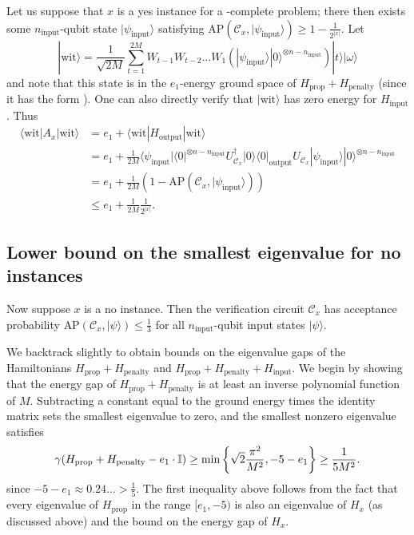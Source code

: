 \documentclass[../thesis-main/thesis-main]{subfiles}
\begin{document}
Let us suppose that  $x$ is a yes instance for a \QMA-complete problem; there then exists some $n_{\text{input}}$-qubit state $|\psi_{\text{input}}\rangle$ satisfying $\text{AP}\left(\mathcal{C}_{x},|\psi_{\text{input}}\rangle\right)\geq1-\frac{1}{2^{|x|}}$. Let
\begin{equation}
|\text{wit}\rangle=\frac{1}{\sqrt{2M}}\sum_{t=1}^{2M}W_{t-1}W_{t-2}\ldots W_{1}\left(|\psi_{\text{input}}\rangle|0\rangle^{\otimes n-n_{\text{input}}}\right)|t\rangle|\omega\rangle
\end{equation}
and note that this state is in the $e_{1}$-energy ground space of
$H_{\text{prop}}+H_{\text{penalty}}$ (since it has the form ).
One can also directly verify that $|\text{wit}\rangle$ has zero energy for $H_{\text{input}}$. Thus
\begin{align*}
\langle\text{wit}|A_{x}|\text{wit}\rangle & =e_{1}+\langle\text{wit}|H_{\text{output}}|\text{wit}\rangle\\
 & =e_{1}+\frac{1}{2M}\langle\psi_{\text{input}}|\langle0|^{\otimes n-n_{\text{input}}}U_{\mathcal{C}_{x}}^{\dagger}|0\rangle\langle0|_{\text{output}}U_{\mathcal{C}_{x}}|\psi_{\text{input}}\rangle|0\rangle^{\otimes n-n_{\text{input}}}\\
 & =e_{1}+\frac{1}{2M}\left(1-\text{AP}(\mathcal{C}_{x},|\psi_{\text{input}}\rangle)\right)\\
 & \leq e_{1}+\frac{1}{2M}\frac{1}{2^{|x|}}.
\end{align*}


\subsection{Lower bound on the smallest eigenvalue for no instances}
\label{sec:mappingno}

Now suppose $x$ is a no instance. Then the verification circuit $\mathcal{C}_{x}$ has acceptance probability $\text{AP}\left(\mathcal{C}_{x},|\psi\rangle\right)\leq\frac{1}{3}$ for all $n_{\text{input}}$-qubit input states $|\psi\rangle$.

We backtrack slightly to obtain bounds on the eigenvalue gaps of the Hamiltonians $H_{\text{prop}}+H_{\text{penalty}}$ and $H_{\text{prop}}+H_{\text{penalty}}+H_{\text{input}}$. We begin by showing that the energy gap of $H_{\text{prop}}+H_{\text{penalty}}$ is at least an inverse polynomial function of $M$. Subtracting a constant equal to the ground energy times the identity matrix sets the smallest eigenvalue to zero, and the smallest nonzero eigenvalue satisfies 
\begin{equation}
\gamma(H_{\text{prop}}+H_{\text{penalty}}-e_{1}\cdot\mathbb{I})\geq\min\left\{ \sqrt{2}\frac{\pi^{2}}{M^{2}},-5-e_{1}\right\} \geq\frac{1}{5M^{2}}.\label{eq:gamma_Ha}
\end{equation}
since $-5-e_{1}\approx0.24\ldots>\frac{1}{5}$. The first inequality above follows from the fact that every eigenvalue of $H_{\text{prop}}$ in the range $[e_{1},-5)$ is also an eigenvalue of $H_{x}$ (as discussed above) and the bound  on the energy gap of $H_{x}$.
\end{document}
